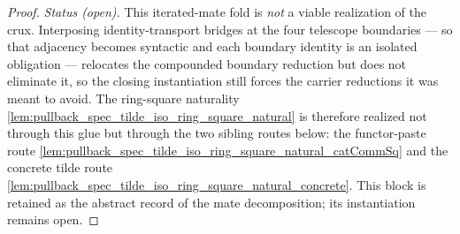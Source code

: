 \begin{lemma}
\begin{proof}
    \medskip
    \emph{Status (open).} This iterated-mate fold is \emph{not} a viable realization of the crux.
    Interposing identity-transport bridges at the four telescope boundaries — so that adjacency
    becomes syntactic and each boundary identity is an isolated obligation — relocates the compounded
    boundary reduction but does not eliminate it, so the closing instantiation still forces the
    carrier reductions it was meant to avoid. The ring-square naturality
    \cref{lem:pullback_spec_tilde_iso_ring_square_natural} is therefore realized not through this
    glue but through the two sibling routes below: the functor-paste route
    \cref{lem:pullback_spec_tilde_iso_ring_square_natural_catCommSq} and the concrete tilde route
    \cref{lem:pullback_spec_tilde_iso_ring_square_natural_concrete}. This block is retained as the
    abstract record of the mate decomposition; its instantiation remains open.
  \end{proof}
\end{lemma}

